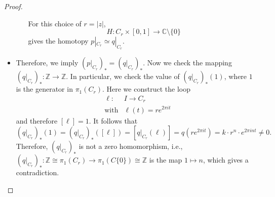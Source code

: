 \begin{proof}
\begin{itemize}
\begin{itemize}
For this choice of $r=|z|$, 
\[
H:C_r\times[0,1]\to\mathbb{C}\setminus\{0\}
\]
gives the homotopy $p|_{C_r}\simeq q|_{C_r}$.
\end{itemize}
\item
Therefore, we imply $(p|_{C_r})_*=(q|_{C_r})_*$.
Now we check the mapping $(q|_{C_r})_*:\mathbb{Z}\to\mathbb{Z}$.
In particular, we check the value of $(q|_{C_r})_*(1)$, where $1$ is the generator in $\pi_1(C_r)$.
Here we construct the loop
\[
\begin{array}{ll}
\ell:&I\to C_r\\
\text{with}&\ell(t)=re^{2\pi it}
\end{array}
\]
and therefore $[\ell]=1$. It follows that 
\[
(q|_{C_r})_*(1) = (q|_{C_r})_*([\ell])=[q|_{C_r}(\ell)]=q(re^{2\pi it})=k\cdot r^n\cdot e^{2\pi int}\ne0.
\]
Therefore, $(q|_{C_r})_*$ is not a zero homomorphism, i.e., $(q|_{C_r})_*:\mathbb{Z}\cong \pi_1(C_r) \to \pi_1(C \{0\}) \cong \mathbb{Z}$ is the map $1 \mapsto n$, which gives a contradiction.
\end{itemize}

\end{proof}














